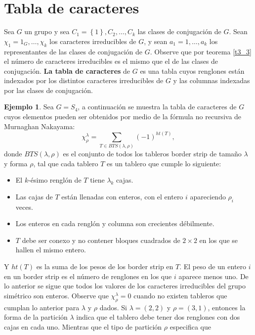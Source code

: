 \documentclass[12pt]{book}
\theoremstyle{definition}
\newtheorem{example}[theorem]{Ejemplo}
\newcounter{in}
\begin{document}
\section{Tabla de caracteres}
\label{sec:ch_ta}

Sea $G$ un grupo y sea $C_1 = \left \{ 1 \right \}, C_2, \ldots, C_k$
las clases de conjugación de $G$. Sean $\chi_1 = 1_G, \ldots, \chi_k$
los caracteres irreducibles de $G$, y sean $a_1 = 1, \ldots, a_k$ los
representantes de las clases de conjugación de $G$. Observe que por
teorema \ref{t3_3} el número de caracteres irreducibles es el mismo
que el de las clases de conjugación. \textbf{La tabla de caracteres} de $G$ es
una tabla cuyos renglones están indexados por los distintos caracteres
irreducibles de $G$ y las columnas indexadas por las clases de
conjugación.
\begin{example}
\label{caracteres-S4}
Sea $G = S_4$, a continuación se muestra la tabla de caracteres de $G$
cuyos elementos pueden ser obtenidos por medio de la fórmula no
recursiva de Murnaghan Nakayama:
\begin{equation}
\chi_{\rho}^{\lambda} = \sum_{T \in BTS(\lambda,\rho)} (-1)^{ht(T)},
\end{equation}
donde $BTS(\lambda,\rho)$ es el conjunto de todos los tableros border
strip de tamaño $\lambda$ y forma $\rho$, tal que cada tablero $T$ es
un tablero que cumple lo siguiente:
\begin{itemize}
\item El $k$-ésimo renglón de $T$ tiene $\lambda_{k}$ cajas.
\item Las cajas de $T$ están llenadas con enteros, con el entero $i$
  apareciendo $\rho_i$ veces.
\item Los enteros en cada renglón y columna son crecientes
  débilmente.
\item $T$ debe ser conexo y no contener bloques cuadrados de $2 \times 2$ en
  los que se hallen el mismo entero.
\end{itemize}
Y $ht(T)$ es la suma de los pesos de los border strip en $T$. El peso
de un entero $i$ en un border strip es el número de renglones en los
que $i$ aparece menos uno. De lo anterior se sigue que todos los
valores de los caracteres irreducibles del grupo simétrico son
enteros. Observe que $\chi_{\rho}^{\lambda} = 0$ cuando no existen
tableros que cumplan lo anterior para $\lambda$ y $\rho$ dados.  Si
$\lambda = (2,2)$ y $\rho = (3,1)$, entonces la forma de la partición
$\lambda$ indica que el tablero debe tener dos renglones con dos cajas
en cada uno. Mientras que el tipo de partición $\rho$ especifica que

\end{example}
\end{document}
